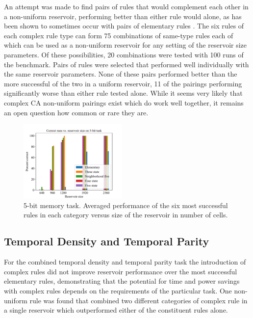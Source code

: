 \documentclass{elsarticle}
\begin{document}
\begin{multicols}{2}
	An attempt was made to find pairs of rules that would complement each other in 
	a non-uniform reservoir, performing better than either rule would alone, as has 
	been shown to sometimes occur with pairs of elementary rules 
	\cite{nichele2017reservoir}. The six rules of each complex rule type can form 
	75 combinations of same-type rules each of which can be used as a non-uniform 
	reservoir for  any setting of the reservoir size parameters. Of these 
	possibilities, 20 combinations were tested with 100 runs of the benchmark.  
	Pairs of rules were selected that performed well individually with the same 
	reservoir parameters.  None of these pairs performed better than the more 
	successful of the two in a uniform reservoir, 11 of the pairings performing 
	significantly worse than either rule tested alone. While it seems very likely 
	that complex CA non-uniform pairings exist which do work well together, it 
	remains an open question how common or rare they are.
	

        \begin{figure}[H]
                \centering
                \includegraphics[width=0.475\textwidth]{bar.pdf}
                \caption{5-bit memory task. Averaged performance of the six 
                   most successful rules in each category versus size of the 
                      reservoir in number of cells. }
                \label{figure:bar_graph}
        \end{figure}
	
        \subsection{Temporal Density and Temporal Parity}
	For the combined temporal density and temporal parity task the introduction of 
	complex rules did not improve reservoir performance over the most successful 
	elementary rules, demonstrating that the potential for time and power savings 
	with complex rules depends on the requirements of the particular task. One 
	non-uniform rule was found that combined two different categories of complex 
	rule in a single reservoir which outperformed either of the constituent rules 
	alone.
	

\end{multicols}
\end{document}

